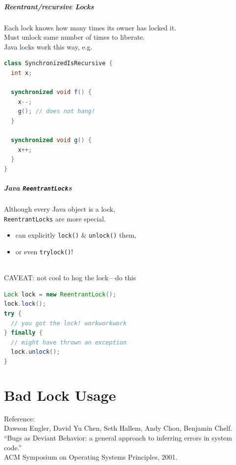 \documentclass{beamer}
\newenvironment{changemargin}[1]{%
  \begin{list}{}{%
    \setlength{\topsep}{0pt}%
    \setlength{\leftmargin}{#1}%
    \setlength{\rightmargin}{1em}
    \setlength{\listparindent}{\parindent}%
    \setlength{\itemindent}{\parindent}%
    \setlength{\parsep}{\parskip}%
  }%
  \item[]}{\end{list}}
\begin{document}
\begin{frame}[fragile]
  \frametitle{Reentrant/recursive Locks}
  \begin{changemargin}{2cm}
    Each lock knows how many times its owner has locked it.\\[1em]
    Must unlock same number of times to liberate.\\[2em]
    Java locks work this way, e.g.
    \begin{lstlisting}[language=Java]
class SynchronizedIsRecursive {
  int x;

  synchronized void f() {
    x--;
    g(); // does not hang!
  }

  synchronized void g() {
    x++;
  }
}
    \end{lstlisting}
  \end{changemargin}
\end{frame}

      
\begin{frame}[fragile]
  \frametitle{Java {\tt ReentrantLock}s}
  \begin{changemargin}{2cm}
    Although every Java object is a lock,\\ {\tt ReentrantLocks} are more special.\\[1em]

    \begin{itemize}
    \item can explicitly {\tt lock()} \& {\tt unlock()} them,
    \item or even {\tt trylock()}!
    \end{itemize}
~\\[1em]
    \alert{CAVEAT:} not cool to hog the lock---do this
    \begin{lstlisting}[language=Java]
Lock lock = new ReentrantLock();
lock.lock();
try {
  // you got the lock! workworkwork
} finally {
  // might have thrown an exception
  lock.unlock();
}
    \end{lstlisting}
  \end{changemargin}
  
\end{frame}

\part{Bad Lock Usage}
\begin{frame}
  \partpage
\end{frame}

\begin{frame}
  \begin{changemargin}{2cm}\small
    Reference: \\[1em]
    Dawson Engler, David Yu Chen, Seth Hallem, Andy Chou, Benjamin Chelf.\\
  ``Bugs as Deviant Behavior: a general approach to inferring errors in system code.''\\
  ACM Symposium on Operating Systems Principles, 2001.
  \end{changemargin}
\end{frame}
\end{document}
